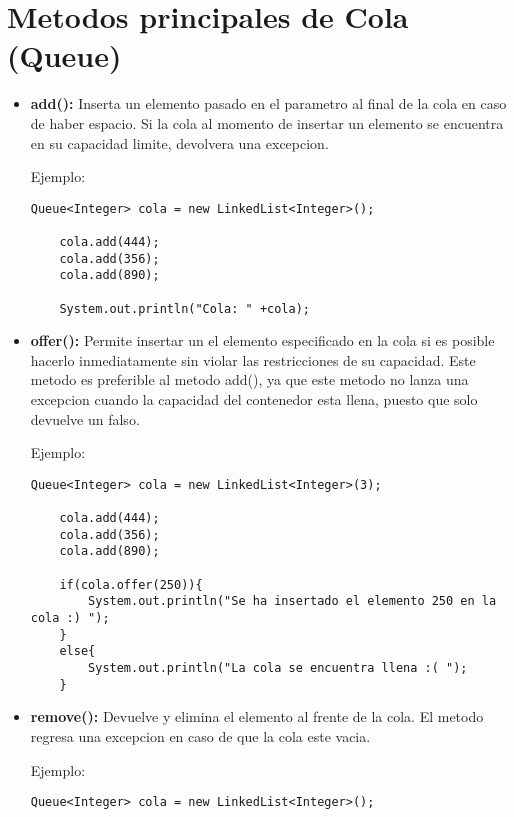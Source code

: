 \documentclass[12pt, letterpaper]{article} %
\begin{document}
\section*{Metodos principales de Cola (Queue)}
\begin{itemize}
    \item \textbf{add():} Inserta un elemento pasado en el parametro al final de la cola en caso de haber espacio. Si la cola al momento de insertar un elemento se encuentra en su capacidad limite, devolvera una excepcion. 
    
    Ejemplo:
    \lstset{language = Java, breaklines=true, basicstyle=\footnotesize}
    \begin{lstlisting}[frame=single]
    Queue<Integer> cola = new LinkedList<Integer>();

    cola.add(444);
    cola.add(356);
    cola.add(890);

    System.out.println("Cola: " +cola);
    \end{lstlisting}

    \item \textbf{offer():} Permite insertar un el elemento especificado en la cola si es posible hacerlo inmediatamente sin violar las restricciones de su capacidad. Este metodo es preferible al metodo add(), ya que este metodo no lanza una excepcion cuando la capacidad del contenedor esta llena, puesto que solo devuelve un falso.
    
    Ejemplo:
    \lstset{language = Java, breaklines=true, basicstyle=\footnotesize}
    \begin{lstlisting}[frame=single]
    Queue<Integer> cola = new LinkedList<Integer>(3);

    cola.add(444);
    cola.add(356);
    cola.add(890);

    if(cola.offer(250)){
        System.out.println("Se ha insertado el elemento 250 en la cola :) ");
    }
    else{
    	System.out.println("La cola se encuentra llena :( ");
    }
    \end{lstlisting}

    \item \textbf{remove():} Devuelve y elimina el elemento al frente de la cola. El metodo regresa una excepcion en caso de que la cola este vacia.
    
    Ejemplo:
    \lstset{language = Java, breaklines=true, basicstyle=\footnotesize}
    \begin{lstlisting}[frame=single]
    Queue<Integer> cola = new LinkedList<Integer>();


\end{lstlisting}
\end{itemize}
\end{document}
